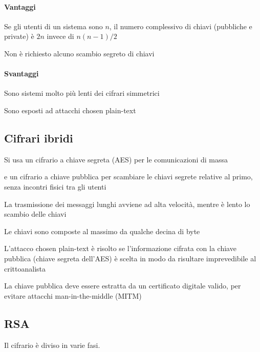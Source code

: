 \documentclass[10pt]{book}
\begin{document}
\paragraph{Vantaggi} \begin{list}{}{}
	\item Se gli utenti di un sistema sono $n$, il numero complessivo di chiavi (pubbliche e private) è $2n$ invece di $n(n-1)/2$
	\item Non è richiesto alcuno scambio segreto di chiavi
\end{list}
\paragraph{Svantaggi} \begin{list}{}{}
	\item Sono sistemi molto più lenti dei cifrari simmetrici
	\item Sono esposti ad attacchi chosen plain-text
\end{list}
\subsection{Cifrari ibridi}
\begin{list}{}{}
	\item Si usa un cifrario a chiave segreta (AES) per le comunicazioni di massa
	\item e un cifrario a chiave pubblica per scambiare le chiavi segrete relative al primo, senza incontri fisici tra gli utenti
	\item La trasmissione dei messaggi lunghi avviene ad alta velocità, mentre è lento lo scambio delle chiavi
	\begin{list}{}{}
		\item Le chiavi sono composte al massimo da qualche decina di byte
		\item L'attacco chosen plain-text è risolto se l'informazione cifrata con la chiave pubblica (chiave segreta dell'AES) è scelta in modo da risultare imprevedibile al crittoanalista
	\end{list}
	\item La chiave pubblica deve essere estratta da un certificato digitale valido, per evitare attacchi man-in-the-middle (MITM)
\end{list}
\subsection{RSA}
Il cifrario è diviso in varie fasi.
\end{document}

